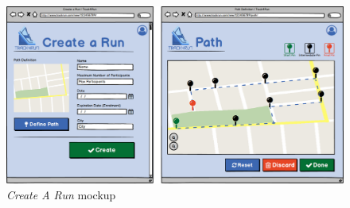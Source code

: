 \begin{figure}
\begin{center}
  \includegraphics[width=\textwidth]{img/mockup/CreateRun.png}
  \hspace{0.05\linewidth}
  \centering
  \caption{\textit{Create A Run} mockup}
  \label{img:createRunMockup}
\end{center}
\end{figure}
